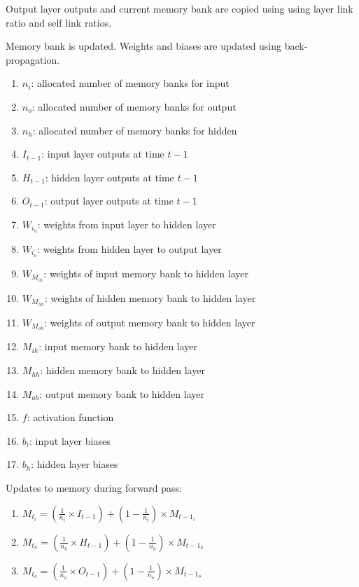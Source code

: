 \documentclass[conference]{IEEEtran}
\begin{document}
Output layer outputs and current memory bank are copied using using layer link ratio and self link ratios.

Memory bank is updated. Weights and biases are updated using back-propagation.

\begin{enumerate}
	\item $n_i$: allocated number of memory banks for input
	\item $n_o$: allocated number of memory banks for output
	\item $n_h$: allocated number of memory banks for hidden
	\item $I_{t-1}$: input layer outputs at time $t-1$
	\item $H_{t-1}$: hidden layer outputs at time $t-1$
	\item $O_{t-1}$: output layer outputs at time $t-1$
	\item $W_{i_h}$: weights from input layer to hidden layer
	\item $W_{i_o}$: weights from hidden layer to output layer
	\item $W_{M_{ih}}$: weights of input memory bank to hidden layer
	\item $W_{M_{hh}}$: weights of hidden memory bank to hidden layer
	\item $W_{M_{oh}}$: weights of output memory bank to hidden layer
	\item $M_{ih}$: input memory bank to hidden layer
	\item $M_{hh}$: hidden memory bank to hidden layer
	\item $M_{oh}$: output memory bank to hidden layer
	\item $f$: activation function
	\item $b_i$: input layer biases
	\item $b_h$: hidden layer biases
\end{enumerate}

Updates to memory during forward pass:

\begin{enumerate}[]
	\item $M_{t_{i}} = \left(\tfrac{1}{n_{i}} \times I_{t-1}\right) + \left(1 - \tfrac{1}{n_{i}}\right) \times M_{t-1_{i}}$
	
	\item $M_{t_{h}} = \left(\tfrac{1}{n_{h}} \times H_{t-1}\right) + \left(1 - \tfrac{1}{n_{h}}\right) \times M_{t-1_{h}}$
	
	\item $M_{t_{o}} = \left(\tfrac{1}{n_{o}} \times O_{t-1}\right) + \left(1 - \tfrac{1}{n_{o}}\right) \times M_{t-1_{o}}$
\end{enumerate}
\end{document}

